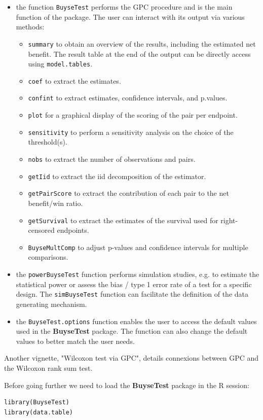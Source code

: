 \documentclass[12pt]{article}
\begin{document}
\begin{itemize}
\item the function \texttt{BuyseTest} performs the GPC procedure and is the main
function of the package. The user can interact with its output via
various methods:
\begin{itemize}
\item \texttt{summary} to obtain an overview of the results, including the
estimated net benefit. The result table at the end of the output
can be directly access using \texttt{model.tables}.
\item \texttt{coef} to extract the estimates.
\item \texttt{confint} to extract estimates, confidence intervals, and p.values.
\item \texttt{plot} for a graphical display of the scoring of the pair per endpoint.
\item \texttt{sensitivity} to perform a sensitivity analysis on the choice of the threshold(s).
\item \texttt{nobs} to extract the number of observations and pairs.
\item \texttt{getIid} to extract the iid decomposition of the estimator.
\item \texttt{getPairScore} to extract the contribution of each pair to the net benefit/win ratio.
\item \texttt{getSurvival} to extract the estimates of the survival used for right-censored endpoints.
\item \texttt{BuyseMultComp} to adjust p-values and confidence intervals for multiple comparisons.
\end{itemize}
\item the \texttt{powerBuyseTest} function performs simulation studies, e.g. to
estimate the statistical power or assess the bias / type 1 error
rate of a test for a specific design. The \texttt{simBuyseTest} function
can facilitate the definition of the data generating mechanism.
\item the \texttt{BuyseTest.options} function enables the user to access the
default values used in the \textbf{BuyseTest} package. The function can
also change the default values to better match the user needs.
\end{itemize}

Another vignette, "Wilcoxon test via GPC", details connexions between
GPC and the Wilcoxon rank sum test.


\clearpage

Before going further we need to load the \textbf{BuyseTest} package in the R
session:
\lstset{language=r,label= ,caption= ,captionpos=b,numbers=none}
\begin{lstlisting}
library(BuyseTest)
library(data.table)
\end{lstlisting}
\end{document}
